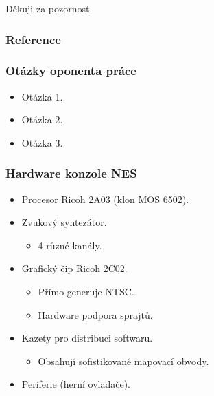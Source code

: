 \documentclass{beamer}
\begin{document}
\begin{frame}
	\huge{Děkuji za pozornost.}	
\end{frame}

\begin{frame}
	\frametitle{Reference}
	\printbibliography
\end{frame}

\appendix

\begin{frame}
	\frametitle{Otázky oponenta práce}
	\begin{itemize}
		\item Otázka 1.
		\pause
		\item Otázka 2.
		\pause
		\item Otázka 3.
	\end{itemize}
\end{frame}

\begin{frame}
	\frametitle{Hardware konzole NES}
	\begin{itemize}
		\item Procesor Ricoh 2A03 (klon MOS 6502).
		\item Zvukový syntezátor.
		\begin{itemize}
			\item 4 různé kanály.
		\end{itemize}
		\item Grafický čip Ricoh 2C02.
		\begin{itemize}
			\item Přímo generuje NTSC.
			\item Hardware podpora sprajtů.
		\end{itemize}
		\item Kazety pro distribuci softwaru.
		\begin{itemize}
			\item Obsahují sofistikované mapovací obvody.
		\end{itemize}
		\item Periferie (herní ovladače).	
	\end{itemize}
\end{frame}
\end{document}
